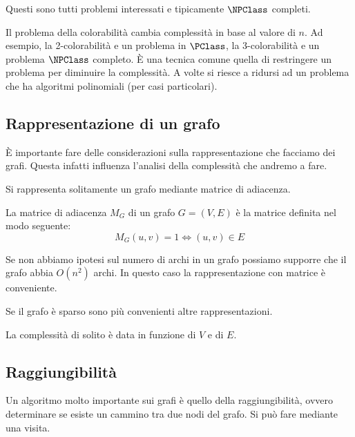 Questi sono tutti problemi interessati e tipicamente $\NPClass$ completi.

Il problema della colorabilità cambia complessità in base al valore di $n$. Ad esempio, la
2-colorabilità e un problema in $\PClass$, la 3-colorabilità e un problema $\NPClass$ completo. È
una tecnica comune quella di restringere un problema per diminuire la complessità. A volte si
riesce a ridursi ad un problema che ha algoritmi polinomiali (per casi particolari).


\subsection{Rappresentazione di un grafo}

È importante fare delle considerazioni sulla rappresentazione che facciamo dei grafi. Questa
infatti influenza l'analisi della complessità che andremo a fare.

Si rappresenta solitamente un grafo mediante matrice di adiacenza.

\begin{defn}
    La matrice di adiacenza $M_{G}$ di un grafo $G = (V,E)$ è la matrice definita nel modo
    seguente:
    \begin{equation*}
        M_{G}(u,v) = 1 \iff (u,v) \in E
    \end{equation*}
\end{defn}

Se non abbiamo ipotesi sul numero di archi in un grafo possiamo supporre che il grafo abbia $O(n^{2})$ archi.
In questo caso la rappresentazione con matrice è conveniente.

Se il grafo è sparso sono più convenienti altre rappresentazioni.

La complessità di solito è data in funzione di $V$ e di $E$.

\subsection{Raggiungibilità}

Un algoritmo molto importante sui grafi è quello della raggiungibilità, ovvero determinare se
esiste un cammino tra due nodi del grafo. Si può fare mediante una visita.

